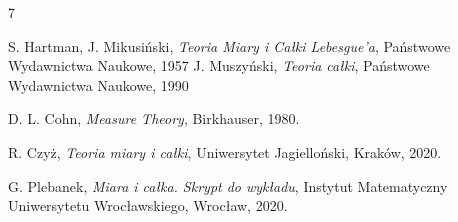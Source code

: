 \begin{thebibliography}{7}

    {\sc S. Hartman, J. Mikusiński},
    \textit{Teoria Miary i Całki Lebesgue'a},
    Państwowe Wydawnictwa Naukowe, 1957
    {\sc J. Muszyński},
    \textit{Teoria całki},
    Państwowe Wydawnictwa Naukowe, 1990

    {\sc D. L. Cohn},
    \textit{Measure Theory}, Birkhauser, 1980.

    {\sc R. Czyż},
    \textit{Teoria miary i całki}, Uniwersytet Jagielloński, Kraków, 2020.

    {\sc G. Plebanek},
    \textit{Miara i całka. Skrypt do wykładu}, Instytut Matematyczny Uniwersytetu Wrocławskiego, Wrocław, 2020.

\end{thebibliography}
